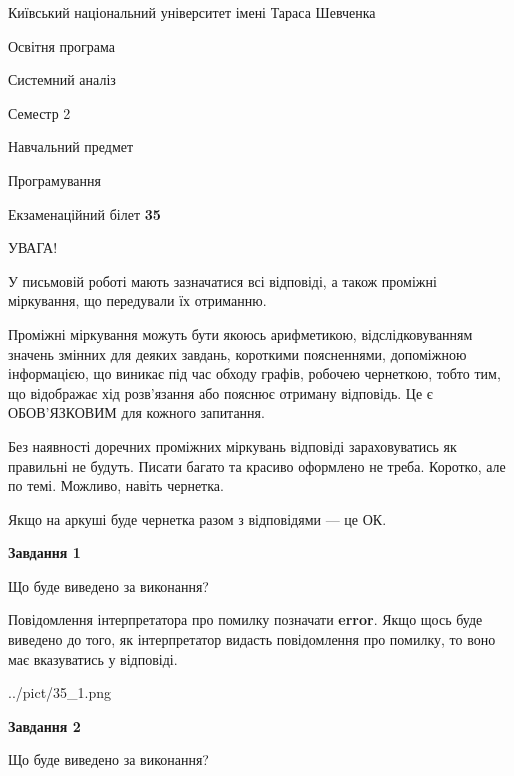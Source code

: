\documentclass[12pt, ukrainian]{article}
\begin{document}
{{\begin {small}\par
{ \center  Київський національний університет імені Тараса Шевченка \par}
{\parbox {5 cm}{Освітня програма \hfill}{\parbox {7 cm}{Системний аналіз \hfill}}\parbox {6 cm}{\hfill Семестр 2}}\par
{\parbox {5 cm} {Навчальний предмет \hfill}\parbox {7 cm}{Програмування \hfill}\parbox {6cm}{\hfill}\par}\vspace{-7pt} \end{small}}{\center Екзаменаційний білет \No \textbf
{ 35 }\par}}
{
\begin {large}
УВАГА!

У письмовій роботі мають зазначатися всі відповіді, а також проміжні міркування, що передували їх отриманню.

Проміжні міркування можуть бути якоюсь арифметикою, відслідковуванням зна\-чень змінних для деяких завдань,
короткими поясненнями, допоміжною інформацією, що виникає під час обходу графів, робочею чернеткою,
тобто тим, що відображає хід розв’язання або пояснює отриману відповідь.
Це є ОБОВ’ЯЗКОВИМ для кожного запитання.

Без наявності доречних проміжних міркувань відповіді зараховуватись як правиль\-ні не будуть.
Писати багато та красиво оформлено не треба. Коротко, але по темі. Можли\-во, навіть чернетка.

Якщо на аркуші буде чернетка разом з відповідями --- це ОК.

\newpage

{\begin {center}\textbf{Завдання 1}\end {center}}\par
Що буде виведено за виконання?

Повідомлення інтерпретатора про помилку позначати \textbf{error}.
Якщо щось буде виведено до того, як інтерпретатор видасть повідомлення про помилку, 
то воно має вказуватись у відповіді. \par


\begin{center}
	{../pict/35_1.png}
\end{center}
\newpage

{\begin {center}\textbf{Завдання 2}\end {center}}\par
Що буде виведено за виконання?


\end{large}}
\end{document}
